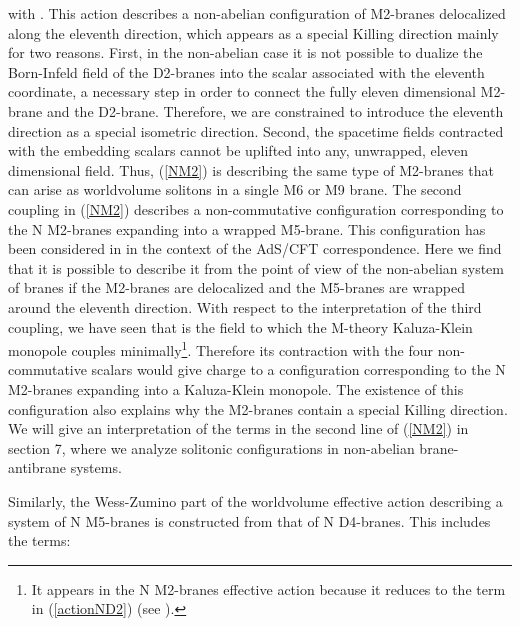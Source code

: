 \documentclass[12pt,a4paper]{article}
\begin{document}
\noindent with \coordHE{}.
This action describes a non-abelian configuration 
of M2-branes delocalized along the eleventh direction,
which appears as a special Killing direction mainly for two reasons.
First, in the non-abelian case it is not possible to dualize the
Born-Infeld field of the D2-branes into the scalar associated with
the eleventh coordinate,
a necessary step in order to connect the 
fully eleven dimensional M2-brane and the D2-brane. Therefore, we
are constrained to introduce the eleventh direction as a special
isometric direction. 
Second, the spacetime fields
contracted with the embedding scalars cannot be uplifted into
any, unwrapped, eleven dimensional field.
Thus, (\ref{NM2}) is describing the same type of
M2-branes that can arise as worldvolume solitons in a single
M6 or M9 brane. 
The second coupling in (\ref{NM2}) describes a non-commutative
configuration corresponding to the N M2-branes expanding into a wrapped
M5-brane. This configuration has been considered in \cite{Bena2} in
the context of the AdS/CFT correspondence. Here we find that it is
possible to describe it from the point of view of the non-abelian
system of branes if the M2-branes are delocalized and the M5-branes
are wrapped around the eleventh direction.
With respect to the interpretation of the third coupling,
we have seen that \coordHE{} is the field to which
the M-theory Kaluza-Klein monopole couples minimally\footnote{It
appears in the N M2-branes effective action because it 
reduces to the term \coordHE{} in (\ref{actionND2})
(see \cite{BEL}).}. Therefore its contraction with the four 
non-commutative scalars would give charge to
a configuration corresponding to the N M2-branes expanding into
a Kaluza-Klein monopole. The existence of this configuration also
explains why the M2-branes contain a special
Killing direction. We will give an interpretation of the terms
in the second line of (\ref{NM2}) in section 7, where we analyze
solitonic configurations in non-abelian brane-antibrane systems.

Similarly, the Wess-Zumino part of the worldvolume effective action
describing a system of N M5-branes is constructed from that of
N D4-branes. This includes the terms:
\end{document}
